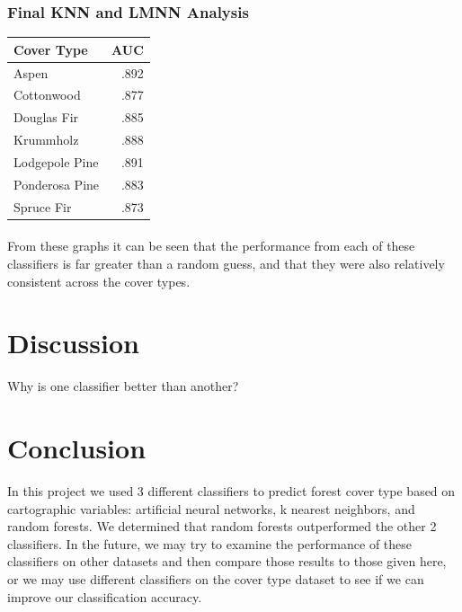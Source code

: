 \documentclass[11pt]{article}
\begin{document}
    \subsubsection{Final KNN and LMNN Analysis}
     
    \begin{center}
     \begin{tabular}{ l | r}
       \hline
       Cover Type & AUC \\ \hline
     
       Aspen & .892 \\ \hline
       Cottonwood & .877 \\ \hline
       Douglas Fir & .885 \\ \hline
       Krummholz & .888 \\ \hline
       Lodgepole Pine & .891 \\ \hline
       Ponderosa Pine & .883 \\ \hline
       Spruce Fir & .873 \\ \hline
     \end{tabular}
    \end{center}
    \paragraph{}
    From these graphs it can be seen that the performance from each of these classifiers is far greater than a random guess, and that they were also relatively consistent across the cover types.
     
    \section{Discussion}
    Why is one classifier better than another?
    \section{Conclusion}
    In this project we used 3 different classifiers to predict forest cover type based on cartographic variables: artificial neural networks, k nearest neighbors, and random forests. We determined that random forests outperformed the other 2 classifiers. In the future, we may try to examine the performance of these classifiers on other datasets and then compare those results to those given here, or we may use different classifiers on the cover type dataset to see if we can improve our classification accuracy.
\end{document}
